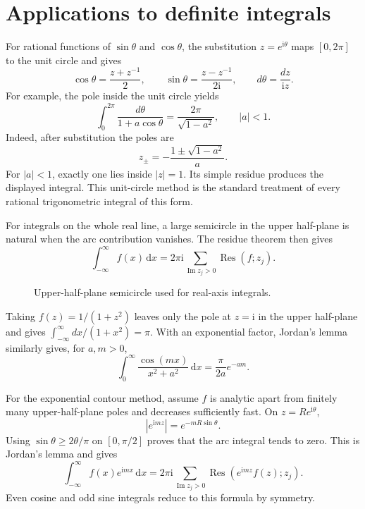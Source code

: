 \section{Applications to definite integrals}

For rational functions of $\sin\theta$ and $\cos\theta$, the substitution $z=e^{\mathrm{i}\theta}$ maps $[0,2\pi]$ to the unit circle and gives
\begin{equation}
\cos\theta=\frac{z+z^{-1}}{2},\qquad
\sin\theta=\frac{z-z^{-1}}{2\mathrm{i}},\qquad d\theta=\frac{dz}{\mathrm{i}z}.
\end{equation}
For example, the pole inside the unit circle yields
\begin{equation}
\int_0^{2\pi}\frac{d\theta}{1+a\cos\theta}=\frac{2\pi}{\sqrt{1-a^2}},\qquad |a|<1.
\end{equation}
Indeed, after substitution the poles are
\begin{equation}
z_{\pm}=-\frac{1\pm\sqrt{1-a^2}}{a}.
\end{equation}
For $|a|<1$, exactly one lies inside $|z|=1$. Its simple residue produces the displayed integral. This unit-circle method is the standard treatment of every rational trigonometric integral of this form.

For integrals on the whole real line, a large semicircle in the upper half-plane is natural when the arc contribution vanishes. The residue theorem then gives
\begin{equation}
\int_{-\infty}^{\infty}f(x)\,\mathrm{d}x=2\pi\mathrm{i}\sum_{\operatorname{Im}z_j>0}\operatorname{Res}(f;z_j).
\end{equation}

\begin{figure}[htb]
    \centering
    \caption{Upper-half-plane semicircle used for real-axis integrals.}
    \label{fig:ch06-semicircle}
\end{figure}

Taking $f(z)=1/(1+z^2)$ leaves only the pole at $z=\mathrm{i}$ in the upper half-plane and gives $\int_{-\infty}^{\infty}dx/(1+x^2)=\pi$. With an exponential factor, Jordan's lemma similarly gives, for $a,m>0$,
\begin{equation}
\int_0^\infty\frac{\cos(mx)}{x^2+a^2}\,\mathrm{d}x=\frac{\pi}{2a}e^{-am}.
\end{equation}

For the exponential contour method, assume $f$ is analytic apart from finitely many upper-half-plane poles and decreases sufficiently fast. On $z=Re^{\mathrm{i}\theta}$,
\begin{equation}
|e^{\mathrm{i}mz}|=e^{-mR\sin\theta}.
\end{equation}
Using $\sin\theta\geq2\theta/\pi$ on $[0,\pi/2]$ proves that the arc integral tends to zero. This is Jordan's lemma and gives
\begin{equation}
\int_{-\infty}^{\infty}f(x)e^{\mathrm{i}mx}\,\mathrm{d}x
=2\pi\mathrm{i}\sum_{\operatorname{Im}z_j>0}\operatorname{Res}\left(e^{\mathrm{i}mz}f(z);z_j\right).
\end{equation}
Even cosine and odd sine integrals reduce to this formula by symmetry.

